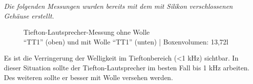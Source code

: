 \newpage
\textit{Die folgenden Messungen wurden bereits mit dem mit Silikon verschlossenen Gehäuse erstellt.}\\
\begin{figure} [H]
	\centering
	\quad
	\caption{Tiefton-Lautsprecher-Messung ohne Wolle\\ \enquote{TT1} (oben) und mit Wolle \enquote{TT1} (unten) | Boxenvolumen: 13,72l}
	\label{fig:4.2.4.1}
\end{figure}
Es ist die Verringerung der Welligkeit im Tieftonbereich (<1 kHz) sichtbar.
In dieser Situation sollte der Tiefton-Lautsprecher im besten Fall bis 1 kHz arbeiten.
Des weiteren sollte er besser mit Wolle versehen werden.


